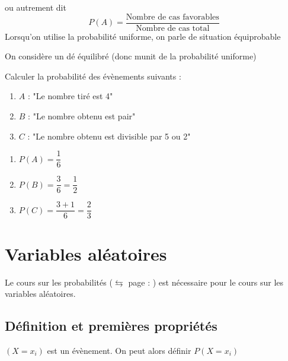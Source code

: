 ou autrement dit
$$P(A) = \dfrac{\text{Nombre de cas favorables}}{\text{Nombre de cas total}}$$
Lorsqu'on utilise la probabilité uniforme, on parle de situation équiprobable\newline

\begin{exemple}
On considère un dé équilibré (donc munit de la probabilité uniforme)\newline

Calculer la probabilité des évènements suivants :
\begin{enumerate}
\item $A$ : "Le nombre tiré est 4"
\item $B$ : "Le nombre obtenu est pair"
\item $C$ : "Le nombre obtenu est divisible par 5 ou 2"
\end{enumerate}
\begin{enumerate}
\item $P(A) = \dfrac{1}{6}$
\item $P(B) = \dfrac{3}{6} = \dfrac{1}{2}$
\item $P(C) = \dfrac{3 + 1}{6} = \dfrac{2}{3}$
\end{enumerate}
\end{exemple}
\chapter{Variables aléatoires}
Le cours sur les probabilités ($\leftrightarrows$ page : \pageref{chap:proba}) est nécessaire pour le cours sur les variables aléatoires.
\section{Définition et premières propriétés}
\newline

$(X = x_i)$ est un évènement. On peut alors définir $P(X = x_i)$\newline

\newline

